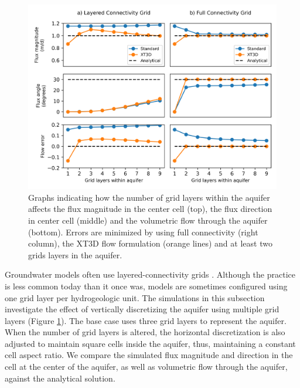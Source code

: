 \documentclass{article}
\begin{document}
\begin{figure}
	\begin{center}
	\includegraphics[scale=0.9]{../figures/fig3paper.png}
	\caption{Graphs indicating how the number of grid layers within the aquifer affects the flux magnitude in the center cell (top), the flux direction in center cell (middle) and the volumetric flow through the aquifer (bottom). Errors are minimized by using full connectivity (right column), the XT3D flow formulation (orange lines) and at least two grids layers in the aquifer.}
	\label{fig:fig3}
	\end{center}
\end{figure}

Groundwater models often use layered-connectivity grids \citep{Reilly2004}. Although the practice is less common today than it once was, models are sometimes configured using one grid layer per hydrogeologic unit. The simulations in this subsection investigate the effect of vertically discretizing the aquifer using multiple grid layers (Figure \ref{fig:fig3}). The base case uses three grid layers to represent the aquifer. When the number of grid layers is altered, the horizontal discretization is also adjusted to maintain square cells inside the aquifer, thus, maintaining a constant cell aspect ratio. We compare the simulated flux magnitude and direction in the cell at the center of the aquifer, as well as volumetric flow through the aquifer, against the analytical solution.
\end{document}
